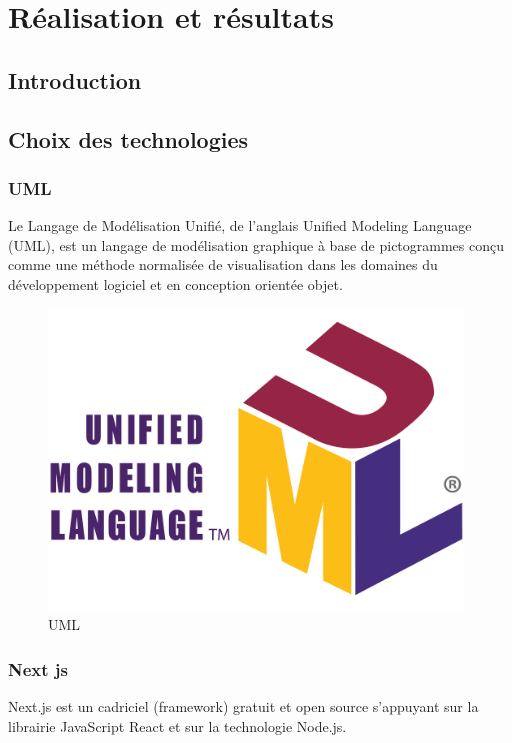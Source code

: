 \chapter{Réalisation et résultats}

\section{Introduction}


\section{Choix des technologies}

\subsection{UML}

Le Langage de Modélisation Unifié, de l'anglais Unified Modeling Language (UML), est un langage de modélisation graphique à base de pictogrammes conçu comme une méthode normalisée de visualisation dans les domaines du développement logiciel et en conception orientée objet.

\begin{figure}[!h]
\begin{center}
\includegraphics[height=8cm]{UML.svg.png}
\end{center}
\caption{UML}
\end{figure}


\subsection{Next js}

Next.js est un cadriciel (framework) gratuit et open source s'appuyant sur la librairie JavaScript React et sur la technologie Node.js.

